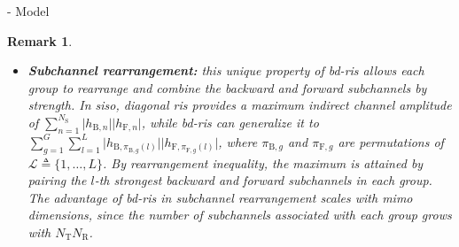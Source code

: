 \documentclass[journal]{IEEEtran}
\newtheorem{remark}{Remark}
\begin{document}
\begin{section}{- Model}
\begin{remark}
\begin{itemize}
			\item \textbf{Subchannel rearrangement:} this unique property of \gls{bd}-\gls{ris} allows each group to rearrange and combine the backward and forward subchannels by strength. In \gls{siso}, diagonal \gls{ris} provides a maximum indirect channel amplitude of $\sum_{n=1}^{N_\mathrm{S}} \lvert h_{\mathrm{B},n} \rvert \lvert h_{\mathrm{F},n} \rvert$, while \gls{bd}-\gls{ris} can generalize it to $\sum_{g=1}^{G} \sum_{l=1}^{L} \lvert h_{\mathrm{B},\pi_{\mathrm{B},g}(l)} \rvert \lvert h_{\mathrm{F},\pi_{\mathrm{F},g}(l)} \rvert$, where $\pi_{\mathrm{B},g}$ and $\pi_{\mathrm{F},g}$ are permutations of $\mathcal{L} \triangleq \{1, \ldots, L\}$. By rearrangement inequality, the maximum is attained by pairing the $l$-th strongest backward and forward subchannels in each group.
			The advantage of \gls{bd}-\gls{ris} in subchannel rearrangement scales with \gls{mimo} dimensions, since the number of subchannels associated with each group grows with $N_\mathrm{T} N_\mathrm{R}$.

\end{itemize}
\end{remark}
\end{section}
\end{document}
